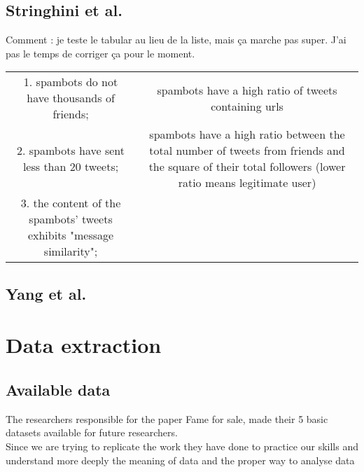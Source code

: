 \documentclass[a4paper,11pt]{article}
\begin{document}
\subsection{Stringhini et al.}

Comment : je teste le tabular au lieu de la liste, mais ça marche pas super. J'ai pas le temps de corriger ça pour le moment.\\

\begin{tabular}{cc}
\hline
1. spambots do not have thousands of friends; & spambots have a high ratio of tweets containing urls\\
2. spambots have sent less than 20 tweets; & spambots have a high ratio between the total number of tweets from friends and the square of their total followers (lower ratio means legitimate user)\\
3. the content of the spambots' tweets exhibits "message similarity"; & \\
\hline
\end{tabular}


\subsection{Yang et al.}


\section{Data extraction}

\subsection{Available data}
The researchers responsible for the paper Fame for sale, made their 5 basic datasets available for future researchers.\\ Since we are trying to replicate the work they have done to practice our skills and understand more deeply the meaning of data and the proper way to analyse data
\end{document}
